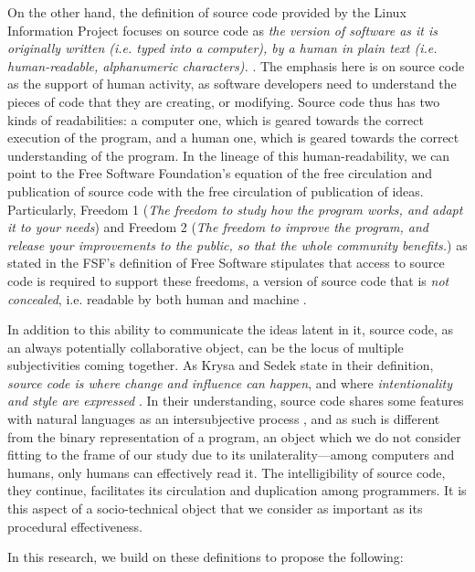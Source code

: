 On the other hand, the definition of source code provided by the Linux Information Project \citep{linuxinformationproject_source_2006} focuses on source code as \emph{the version of software as it is originally written (i.e. typed into a computer), by a human in plain text (i.e. human-readable, alphanumeric characters).} \citep{linuxinformationproject_source_2004}. The emphasis here is on source code as the support of human activity, as software developers need to understand the pieces of code that they are creating, or modifying. Source code thus has two kinds of readabilities: a computer one, which is geared towards the correct execution of the program, and a human one, which is geared towards the correct understanding of the program. In the lineage of this human-readability, we can point to the Free Software Foundation's equation of the free circulation and publication of source code with the free circulation of publication of ideas. Particularly, Freedom 1 (\emph{The freedom to study how the program works, and adapt it to your needs}) and Freedom 2 (\emph{The freedom to improve the program, and release your improvements to the public, so that the whole community benefits.}) as stated in the FSF's definition of Free Software stipulates that access to source code is required to support these freedoms, a version of source code that is \emph{not concealed}, i.e. readable by both human and machine \citep{stallman_free_2002}.

In addition to this ability to communicate the ideas latent in it, source code, as an always potentially collaborative object, can be the locus of multiple subjectivities coming together. As Krysa and Sedek state in their definition, \emph{source code is where change and influence can happen}, and where \emph{intentionality and style are expressed} \citep{fuller_software_2008}. In their understanding, source code shares some features with natural languages as an intersubjective process \citep{voloshinov_marxism_1986}, and as such is different from the binary representation of a program, an object which we do not consider fitting to the frame of our study due to its unilaterality—among computers and humans, only humans can effectively read it. The intelligibility of source code, they continue, facilitates its circulation and duplication among programmers. It is this aspect of a socio-technical object that we consider as important as its procedural effectiveness.

In this research, we build on these definitions to propose the following:

